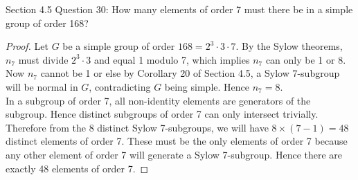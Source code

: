 Section 4.5 Question 30: How many elements of order 7 must there be in a
simple group of order 168?

\begin{proof}
  Let $G$ be a simple group of order $168=2^3\cdot3\cdot7$. By the Sylow
  theorems, $n_7$ must divide $2^3\cdot3$ and equal 1 modulo 7, which
  implies $n_7$ can only be 1 or 8. Now $n_7$ cannot be 1 or else by
  Corollary 20 of Section 4.5, a Sylow 7-subgroup will be normal in $G$,
  contradicting $G$ being simple. Hence $n_7=8$. \\

  In a subgroup of order 7, all non-identity elements are generators of
  the subgroup. Hence distinct subgroups of order 7 can only intersect
  trivially. Therefore from the 8 distinct Sylow 7-subgroups, we will have
  $8\times(7-1)=48$ distinct elements of order 7. These must be the only
  elements of order 7 because any other element of order 7 will generate a
  Sylow 7-subgroup. Hence there are exactly 48 elements of order 7.
\end{proof}
